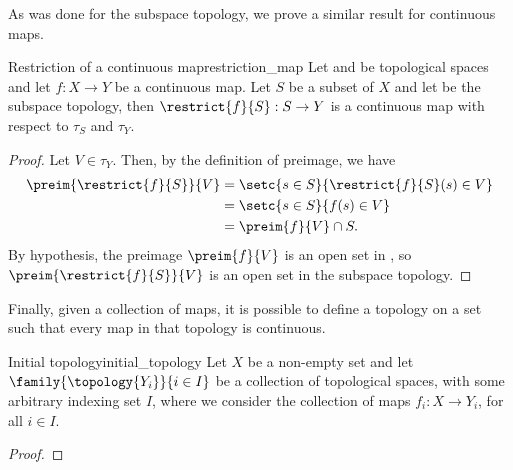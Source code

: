 As was done for the subspace topology, we prove a similar result for continuous maps.
\begin{proposition}{Restriction of a continuous map}{restriction_map}
    Let  and  be topological spaces and let \(f : X \to Y\) be a continuous map. Let \(S\) be a subset of \(X\) and let  be the subspace topology, then \(\restrict{f}{S} : S \to Y\) is a continuous map with respect to \(\tau_S\) and \(\tau_Y\).
\end{proposition}
\begin{proof}
    Let \(V \in \tau_Y\). Then, by the definition of preimage, we have
    \begin{align*}
        \preim{\restrict{f}{S}}{V} &= \setc{s \in S}{\restrict{f}{S}(s) \in V}\\
                                &= \setc{s \in S}{f(s) \in V}\\
                                &= \preim{f}{V} \cap S.
    \end{align*}
    By hypothesis, the preimage \(\preim{f}{V}\) is an open set in , so \(\preim{\restrict{f}{S}}{V}\) is an open set in the subspace topology.
\end{proof}

Finally, given a collection of maps, it is possible to define a topology on a set such that every map in that topology is continuous.
\begin{proposition}{Initial topology}{initial_topology}
    Let \(X\) be a non-empty set and let \(\family{\topology{Y_i}}{i\in I}\) be a collection of topological spaces, with some arbitrary indexing set \(I\), where we consider the collection of maps \(f_i : X \to Y_i\), for all \(i \in I\). 
\end{proposition}
\begin{proof}
\end{proof}

